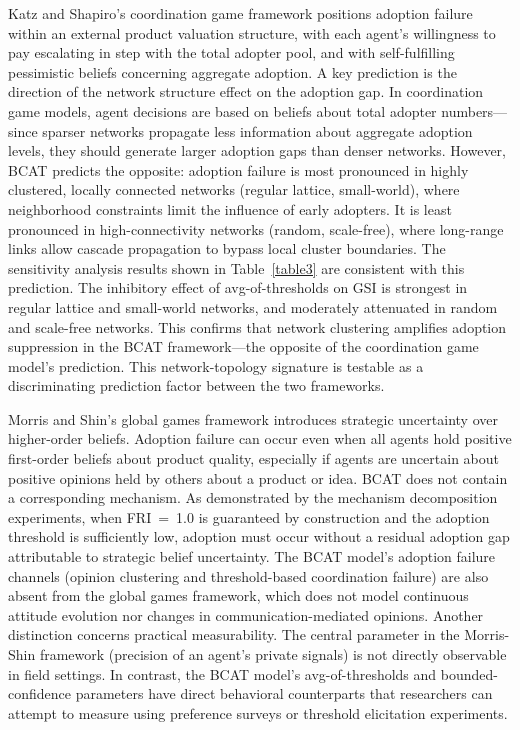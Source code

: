 \documentclass[10pt,letterpaper]{article}
\begin{document}
Katz and Shapiro's \cite{Katz1985} coordination game framework positions adoption failure within an external product valuation structure, with each agent's willingness to pay escalating in step with the total adopter pool, and with self-fulfilling pessimistic beliefs concerning aggregate adoption. A key prediction is the direction of the network structure effect on the adoption gap. In coordination game models, agent decisions are based on beliefs about total adopter numbers---since sparser networks propagate less information about aggregate adoption levels, they should generate larger adoption gaps than denser networks. However, BCAT predicts the opposite: adoption failure is most pronounced in highly clustered, locally connected networks (regular lattice, small-world), where neighborhood constraints limit the influence of early adopters. It is least pronounced in high-connectivity networks (random, scale-free), where long-range links allow cascade propagation to bypass local cluster boundaries. The sensitivity analysis results shown in Table~\ref{table3} are consistent with this prediction. The inhibitory effect of avg-of-thresholds on GSI is strongest in regular lattice and small-world networks, and moderately attenuated in random and scale-free networks. This confirms that network clustering amplifies adoption suppression in the BCAT framework---the opposite of the coordination game model's prediction. This network-topology signature is testable as a discriminating prediction factor between the two frameworks.

Morris and Shin's \cite{Morris2003} global games framework introduces strategic uncertainty over higher-order beliefs. Adoption failure can occur even when all agents hold positive first-order beliefs about product quality, especially if agents are uncertain about positive opinions held by others about a product or idea. BCAT does not contain a corresponding mechanism. As demonstrated by the mechanism decomposition experiments, when FRI~=~1.0 is guaranteed by construction and the adoption threshold is sufficiently low, adoption must occur without a residual adoption gap attributable to strategic belief uncertainty. The BCAT model's adoption failure channels (opinion clustering and threshold-based coordination failure) are also absent from the global games framework, which does not model continuous attitude evolution nor changes in communication-mediated opinions. Another distinction concerns practical measurability. The central parameter in the Morris-Shin framework (precision of an agent's private signals) is not directly observable in field settings. In contrast, the BCAT model's avg-of-thresholds and bounded-confidence parameters have direct behavioral counterparts that researchers can attempt to measure using preference surveys or threshold elicitation experiments.
\end{document}
